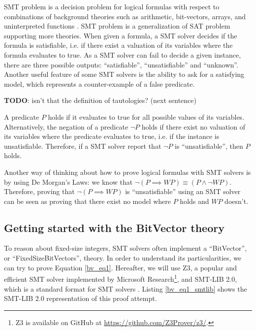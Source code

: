 \documentclass{kththesis}
\newcommand{\WP}{\ensuremath{\mathit{WP}}}
\begin{document}
\acrfull{SMT} problem is a decision problem for logical formulas with respect to combinations of background theories such as arithmetic, bit-vectors, arrays, and uninterpreted functions \cite{nikolaj_bjorner_programming_2019}. \gls{SMT} problem is a generalization of \gls{SAT} problem supporting more theories. When given a formula, a \gls{SMT} solver decides if the formula is satisfiable, i.e. if there exist a valuation of its variables where the formula evaluates to true. As a \gls{SMT} solver can fail to decide a given instance, there are three possible outputs: ``satisfiable'', ``unsatisfiable'' and ``unknown''. Another useful feature of some \gls{SMT} solvers is the ability to ask for a satisfying model, which represents a counter-example of a false predicate.

\textbf{TODO}: isn't that the definition of tautologies? (next sentence)

A predicate $P$ holds if it evaluates to true for all possible values of its variables. Alternatively, the negation of a predicate $\neg P$ holds if there exist no valuation of its variables where the predicate evaluates to true, i.e. if the instance is unsatisfiable. Therefore, if a \gls{SMT} solver report that $\neg P$ is ``unsatisfiable'', then $P$ holds.

Another way of thinking about how to prove logical formulas with \gls{SMT} solvers is by using De Morgan's Laws: we know that $\neg (P \implies \WP) \equiv (P \land \neg \WP)$. Therefore, proving that $\neg (P \implies \WP)$ is ``unsatisfiable'' using an \gls{SMT} solver can be seen as proving that there exist no model where $P$ holds and $\WP$ doesn't.

\subsection{Getting started with the BitVector theory}

To reason about fixed-size integers, \gls{SMT} solvers often implement a ``BitVector'', or ``FixedSizeBitVectors'', theory. In order to understand its particularities, we can try to prove Equation \ref{bv_eq1}. Hereafter, we will use Z3, a popular and efficient \gls{SMT} solver implemented by Microsoft Research\footnote{Z3 is available on GitHub at \url{https://github.com/Z3Prover/z3/}.}, and SMT-LIB 2.0, which is a standard format for \gls{SMT} solvers \cite{barrett_satisfiability_2016}. Listing \ref{bv_eq1_smtlib} shows the SMT-LIB 2.0 representation of this proof attempt.
\end{document}
